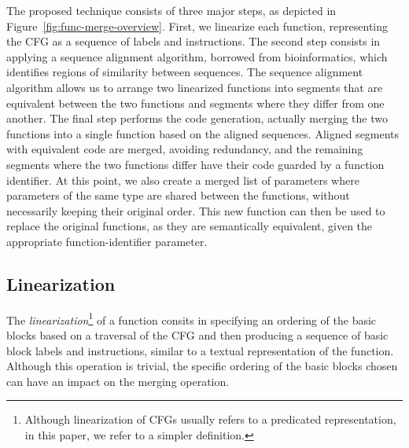 The proposed technique consists of three major steps, as depicted in
Figure~\ref{fig:func-merge-overview}.
First, we linearize each function, representing the CFG as a sequence of 
labels and instructions.
The second step consists in applying a sequence alignment algorithm, borrowed
from bioinformatics, which identifies regions of similarity between sequences.
The sequence alignment algorithm allows us to arrange two linearized functions
into segments that are equivalent between the two functions and segments where
they differ from one another.
The final step performs the code generation, actually merging the two functions
into a single function based on the aligned sequences.
Aligned segments with equivalent code are merged, avoiding redundancy, %
and the remaining segments where the two functions differ have their code
guarded by a function identifier.
At this point, we also create a merged list of parameters where parameters of
the same type are shared between the functions, without necessarily keeping
their original order.
This new function can then be used to replace the original functions, as they
are semantically equivalent, given the appropriate function-identifier
parameter.

\subsection{Linearization}

The \textit{linearization}\footnote{Although linearization of CFGs
usually refers to a predicated representation, %
in this paper, we refer to a simpler definition.}
of a function consits in specifying an ordering of the basic blocks based on a
traversal of the CFG and then producing a sequence of basic block labels and
instructions, similar to a textual representation of the function.
Although this operation is trivial, the specific ordering of the basic blocks
chosen can have an impact on the merging operation.


